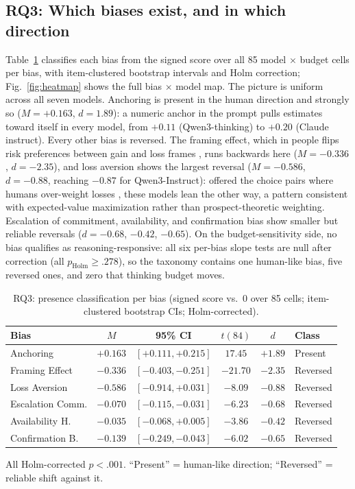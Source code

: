 \documentclass[conference]{IEEEtran}
\begin{document}
\subsection{RQ3: Which biases exist, and in which direction}
\label{sec:rq3}
Table~\ref{tab:rq3} classifies each bias from the signed score over all 85 model $\times$ budget cells per bias, with item-clustered bootstrap intervals and Holm correction; Fig.~\ref{fig:heatmap} shows the full bias $\times$ model map. The picture is uniform across all seven models. Anchoring is present in the human direction and strongly so ($M = +0.163$, $d = 1.89$): a numeric anchor in the prompt pulls estimates toward itself in every model, from $+0.11$ (Qwen3-thinking) to $+0.20$ (Claude instruct). Every other bias is reversed. The framing effect, which in people flips risk preferences between gain and loss frames \cite{tversky1981framing}, runs backwards here ($M = -0.336$, $d = -2.35$), and loss aversion shows the largest reversal ($M = -0.586$, $d = -0.88$, reaching $-0.87$ for Qwen3-Instruct): offered the choice pairs where humans over-weight losses \cite{kahneman1979prospect}, these models lean the other way, a pattern consistent with expected-value maximization rather than prospect-theoretic weighting. Escalation of commitment, availability, and confirmation bias show smaller but reliable reversals ($d = -0.68$, $-0.42$, $-0.65$). On the budget-sensitivity side, no bias qualifies as reasoning-responsive: all six per-bias slope tests are null after correction (all $p_{\text{Holm}} \ge .278$), so the taxonomy contains one human-like bias, five reversed ones, and zero that thinking budget moves.

\begin{table}[t]
\centering
\caption{RQ3: presence classification per bias (signed score vs.\ 0 over 85 cells; item-clustered bootstrap CIs; Holm-corrected).}
\label{tab:rq3}
\footnotesize
\setlength{\tabcolsep}{2.4pt}
\begin{tabular}{lccccl}
\hline
Bias & $M$ & 95\% CI & $t(84)$ & $d$ & Class \\
\hline
Anchoring        & $+0.163$ & $[+0.111, +0.215]$ & $17.45$  & $+1.89$ & Present \\
Framing Effect   & $-0.336$ & $[-0.403, -0.251]$ & $-21.70$ & $-2.35$ & Reversed \\
Loss Aversion    & $-0.586$ & $[-0.914, +0.031]$ & $-8.09$  & $-0.88$ & Reversed \\
Escalation Comm. & $-0.070$ & $[-0.115, -0.031]$ & $-6.23$  & $-0.68$ & Reversed \\
Availability H.  & $-0.035$ & $[-0.068, +0.005]$ & $-3.86$  & $-0.42$ & Reversed \\
Confirmation B.  & $-0.139$ & $[-0.249, -0.043]$ & $-6.02$  & $-0.65$ & Reversed \\
\hline
\end{tabular}
\par\smallskip\footnotesize All Holm-corrected $p < .001$. ``Present'' = human-like direction; ``Reversed'' = reliable shift against it.
\end{table}
\end{document}
